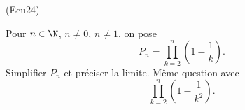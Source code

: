 \begin{tiny}(Ecu24)\end{tiny} Pour $n\in \N$, $n\neq 0$, $n\neq 1$, on pose
\begin{displaymath}
  P_n = \prod_{k=2}^n \left( 1 - \frac{1}{k}\right). 
\end{displaymath}
Simplifier $P_n$ et préciser la limite. Même question avec
\begin{displaymath}
  \prod_{k=2}^n \left( 1 - \frac{1}{k^2}\right). 
\end{displaymath}
